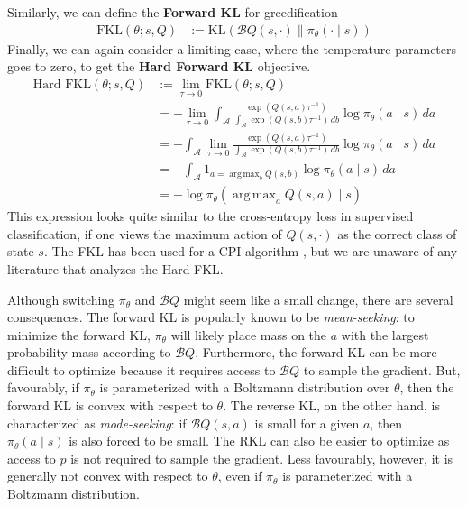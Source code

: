 \documentclass[twoside,11pt]{article}
\DeclareMathOperator*{\argmax}{arg\,max}
\newcommand{\actionspace}{\mathcal{A}}
\newcommand{\Qhat}{{Q}}
\newcommand{\KL}{\mathrm{KL}}
\newcommand{\policyparams}{\theta}
\newcommand{\boltzmannQ}{\mathcal{B}Q}
\newcommand{\entropy}{\mathcal{H}}
\newcommand{\defeq}{:=}
\begin{document}
Similarly, we can define the \textbf{Forward KL} for greedification 
%
\begin{align}
\text{FKL}(\policyparams; s, \Qhat) &\defeq  %
    \KL\left(\boltzmannQ(s, \cdot)  \parallel \pi_\policyparams(\cdot \mid s) \right)\nonumber%
\end{align}
Finally, we can again consider a limiting case, where the temperature parameters goes to zero, to get the \textbf{Hard Forward KL} objective.
%
\begin{align*}
  \text{Hard FKL}(\policyparams; s, \Qhat) &\defeq  \lim_{\tau \to 0} \text{FKL}(\policyparams; s, \Qhat) \\
  &= -\lim_{\tau \to 0}\int_\actionspace \frac{\exp(Q(s, a)\tau^{-1})}{\int_\actionspace \exp(Q(s, b)\tau^{-1}) \, db} \log \pi_\policyparams(a \mid s) \, da\\
    &= -\int_\actionspace \lim_{\tau \to 0} \frac{\exp(Q(s, a)\tau^{-1})}{\int_\actionspace \exp(Q(s, b)\tau^{-1}) \, db} \log \pi_\policyparams(a \mid s) \, da \\
    &= -\int_\actionspace 1_{a = \argmax_b Q(s, b)} \log \pi_\policyparams(a \mid s) \, da \\
    &= -\log \pi_\policyparams(\argmax_a Q(s, a) \mid s) 
\end{align*}
%
This expression looks quite similar to the cross-entropy loss in supervised classification, if one views the maximum action of $Q(s, \cdot)$ as the correct class of state $s$. The FKL has been used for a CPI algorithm \citep{vieillard2019deep}, but we are unaware of any literature that analyzes the Hard FKL. %

Although switching $\pi_\policyparams$ and $\boltzmannQ$ might seem like a small change, there are several consequences. The forward KL is popularly known to be \textit{mean-seeking}: to minimize the forward KL, $\pi_\policyparams$ will likely place mass on the $a$ with the largest probability mass according to $\boltzmannQ$. Furthermore, the forward KL can be more difficult to optimize because it requires access to $\boltzmannQ$ to sample the gradient. But, favourably, if $\pi_\theta$ is parameterized with a Boltzmann distribution over $\theta$, then the forward KL is convex with respect to $\theta$. The reverse KL, on the other hand, is characterized as \textit{mode-seeking}: if $\boltzmannQ(s, a)$ is small for a given $a$, then $\pi_\theta(a \mid s)$ is also forced to be small. The RKL can also be easier to optimize as access to $p$ is not required to sample the gradient. Less favourably, however, it is generally not convex with respect to $\theta$, even if $\pi_\theta$ is parameterized with a Boltzmann distribution. 
\end{document}

